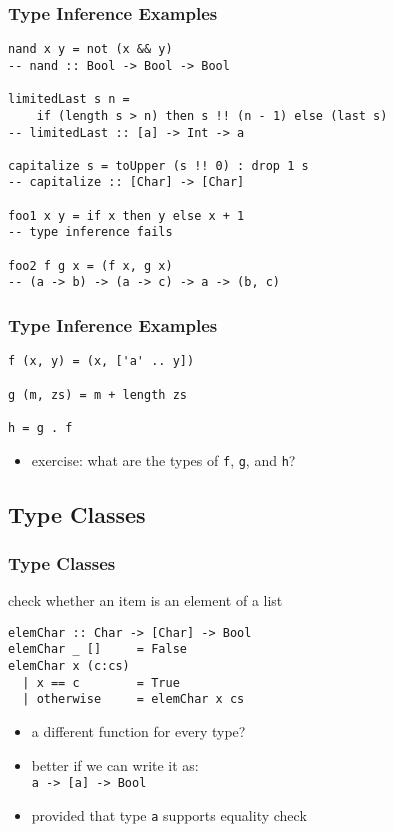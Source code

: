 \documentclass[dvipsnames]{beamer}
\theoremstyle{plain}
\begin{document}
\begin{frame}[fragile]
  \frametitle{Type Inference Examples}

  \begin{lstlisting}
nand x y = not (x && y)
-- nand :: Bool -> Bool -> Bool

limitedLast s n =
    if (length s > n) then s !! (n - 1) else (last s)
-- limitedLast :: [a] -> Int -> a

capitalize s = toUpper (s !! 0) : drop 1 s
-- capitalize :: [Char] -> [Char]

foo1 x y = if x then y else x + 1
-- type inference fails

foo2 f g x = (f x, g x)
-- (a -> b) -> (a -> c) -> a -> (b, c)
  \end{lstlisting}

\end{frame}

\begin{frame}[fragile]
  \frametitle{Type Inference Examples}

  \begin{lstlisting}
f (x, y) = (x, ['a' .. y])

g (m, zs) = m + length zs

h = g . f
  \end{lstlisting}

  \medskip
  \begin{itemize}
    \item exercise: what are the types of \lstinline|f|, \lstinline|g|,
      and \lstinline|h|?
  \end{itemize}
\end{frame}

\subsection{Type Classes}

\begin{frame}[fragile]
  \frametitle{Type Classes}

  \begin{exampleblock}{check whether an item is an element of a list}
    \begin{lstlisting}
elemChar :: Char -> [Char] -> Bool
elemChar _ []     = False
elemChar x (c:cs)
  | x == c        = True
  | otherwise     = elemChar x cs
    \end{lstlisting}
  \end{exampleblock}

  \pause
  \begin{itemize}
    \item a different function for every type?
    \item better if we can write it as:\\
      \lstinline|a -> [a] -> Bool|
    \item provided that type \lstinline|a| supports equality check
  \end{itemize}
\end{frame}
\end{document}
